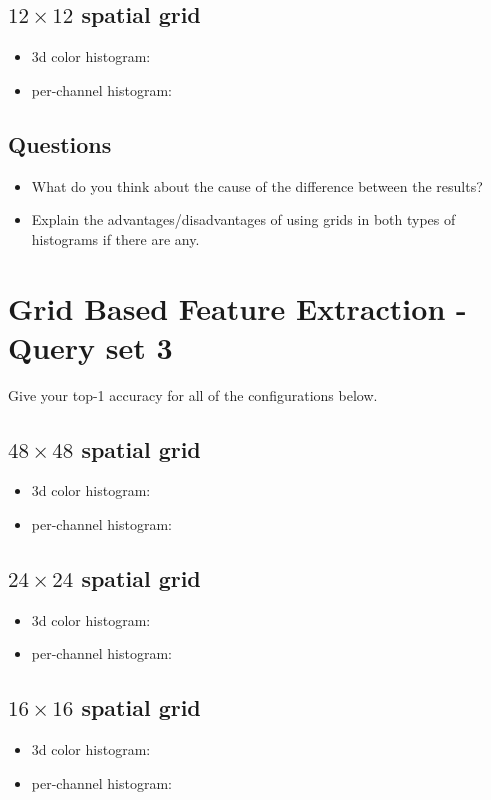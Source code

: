 \documentclass[12pt]{article}
\begin{document}
\subsection{$12\times12$ spatial grid}
\begin{itemize}
\item 3d color histogram:
\item per-channel histogram:
\end{itemize}

\subsection{Questions}
\begin{itemize}
\item What do you think about the cause of the difference between the results?
\item Explain the advantages/disadvantages of using grids in both types of histograms if there are any.
\end{itemize}


\section{Grid Based Feature Extraction - Query set 3}
Give your top-1 accuracy for all of the configurations below.

\subsection{$48\times48$ spatial grid}
\begin{itemize}
\item 3d color histogram:
\item per-channel histogram:
\end{itemize}

\subsection{$24\times24$ spatial grid}
\begin{itemize}
\item 3d color histogram:
\item per-channel histogram:
\end{itemize}

\subsection{$16\times16$ spatial grid}
\begin{itemize}
\item 3d color histogram:
\item per-channel histogram:
\end{itemize}
\end{document}
